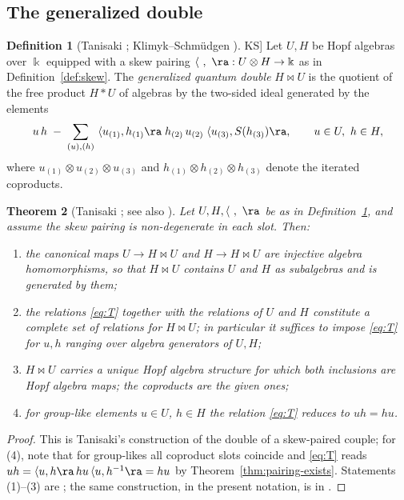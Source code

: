 \documentclass[11pt]{amsart}
\newcommand{\bk}{\Bbbk}
\newcommand{\la}{\langle}
\theoremstyle{plain}
\newtheorem{theorem}{Theorem}[section]
\theoremstyle{definition}
\newtheorem{definition}[theorem]{Definition}
\numberwithin{equation}{section}
\begin{document}
\subsection{The generalized double}

\begin{definition}[Tanisaki \cite{Tan}; Klimyk--Schm\"udgen \cite[\S 8]{KS}]
\label{def:double}
Let $U,H$ be Hopf algebras over $\bk$ equipped with a skew pairing
$\la\ ,\ \ra:U\otimes H\to\bk$ as in Definition~\ref{def:skew}.  The
\emph{generalized quantum double} $H\bowtie U$ is the quotient of the free
product $H*U$ of algebras by the two-sided ideal generated by the elements
\begin{equation}\label{eq:T}
u\,h\;-\;\sum_{(u),(h)}\ \la u_{(1)},h_{(1)}\ra\; h_{(2)}\,u_{(2)}\;
\la u_{(3)},S(h_{(3)})\ra ,
\qquad u\in U,\ h\in H ,
\end{equation}
where $u_{(1)}\otimes u_{(2)}\otimes u_{(3)}$ and
$h_{(1)}\otimes h_{(2)}\otimes h_{(3)}$ denote the iterated coproducts.
\end{definition}

\begin{theorem}[Tanisaki {\cite[Sec.~1--2]{Tan}}; see also
{\cite[\S 8]{KS}}]\label{thm:Tanisaki}
Let $U,H,\la\ ,\ \ra$ be as in Definition~\ref{def:double}, and assume the
skew pairing is non-degenerate in each slot.  Then:
\begin{enumerate}
\item the canonical maps $U\to H\bowtie U$ and $H\to H\bowtie U$ are
injective algebra homomorphisms, so that $H\bowtie U$ contains $U$ and $H$ as
subalgebras and is generated by them;
\item the relations \eqref{eq:T} together with the relations of $U$ and $H$
constitute a complete set of relations for $H\bowtie U$; in particular it
suffices to impose \eqref{eq:T} for $u,h$ ranging over algebra generators of
$U,H$;
\item $H\bowtie U$ carries a unique Hopf algebra structure for which both
inclusions are Hopf algebra maps; the coproducts are the given ones;
\item for group-like elements $u\in U$, $h\in H$ the relation \eqref{eq:T}
reduces to $uh=hu$.
\end{enumerate}
\end{theorem}

\begin{proof}
This is Tanisaki's construction of the double of a skew-paired couple; for
(4), note that for group-likes all coproduct slots coincide and
\eqref{eq:T} reads $uh=\la u,h\ra\,hu\,\la u,h^{-1}\ra=hu$ by
Theorem~\ref{thm:pairing-exists}.  Statements (1)--(3) are
\cite[Sec.~1--2]{Tan}; the same construction, in the present notation, is in
\cite[\S 8]{KS}.
\end{proof}
\end{document}
